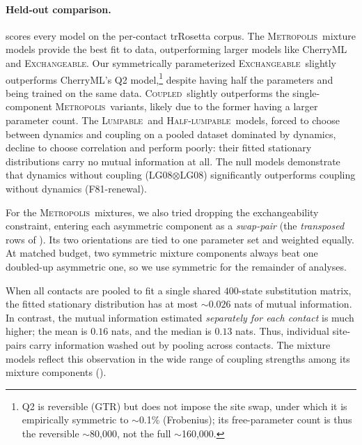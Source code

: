 \documentclass[11pt]{article}
\newcommand{\Coupledm}{\textsc{Coupled}}
\newcommand{\Exchm}{\textsc{Exchangeable}}
\newcommand{\Metrop}{\textsc{Metropolis}}
\newcommand{\Lumpm}{\textsc{Lumpable}}
\newcommand{\Halflump}{\textsc{Half-lumpable}}
\begin{document}
\paragraph{Held-out comparison.}  scores every model on the
per-contact trRosetta corpus.
The \Metrop\ mixture models provide the best fit to data, outperforming larger models like CherryML and \Exchm.
Our symmetrically parameterized \Exchm\ slightly outperforms CherryML's Q2
model,\footnote{Q2 is reversible (GTR) but does not impose the site swap, under which it is
empirically symmetric to $\sim$0.1\% (Frobenius); its free-parameter count is thus the reversible
$\sim$80{,}000, not the full $\sim$160{,}000.} despite having half the parameters and being
trained on the same data.
\Coupledm\ slightly outperforms the single-component \Metrop\ variants, likely due to the former
having a larger parameter count.
The \Lumpm\ and \Halflump\ models, forced to choose between dynamics and coupling on a
pooled dataset dominated by dynamics, decline to choose correlation and perform poorly:
their fitted stationary distributions carry no mutual information at all.
The null models demonstrate that dynamics without coupling (LG08$\otimes$LG08) significantly outperforms coupling without dynamics (F81-renewal).

For the \Metrop\ mixtures, we also tried dropping the exchangeability constraint,
entering each asymmetric component as a \emph{swap-pair} (the \emph{transposed} rows of ). Its two orientations are tied to one parameter set and weighted equally.
At matched budget, two symmetric mixture components always beat
one doubled-up asymmetric one, so we use symmetric for the remainder of analyses.

When all contacts are pooled to fit a single shared $400$-state substitution matrix,
the fitted stationary distribution has at most $\sim 0.026$ nats of mutual
information. In contrast, the mutual information estimated \emph{separately for each contact}
is much higher; the mean is $0.16$ nats, and the median is $0.13$ nats.
Thus, individual site-pairs carry information washed out by pooling across contacts.
The mixture models reflect this observation in the wide range of coupling
strengths among its mixture components ().
\end{document}
